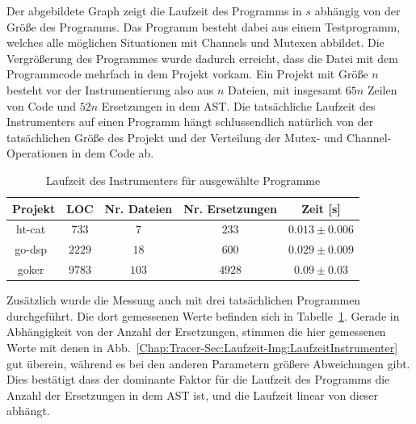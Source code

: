 Der abgebildete Graph zeigt die Laufzeit des Programms in $s$ abhängig von der 
Größe des Programms. Das Programm besteht dabei aus einem Testprogramm, welches 
alle möglichen Situationen mit Channels und Mutexen abbildet. Die Vergrößerung 
des Programmes wurde dadurch erreicht, dass die Datei mit dem Programmcode 
mehrfach in dem Projekt vorkam. Ein Projekt mit Größe $n$ besteht vor der 
Instrumentierung also 
aus $n$ Dateien, mit insgesamt $65n$ Zeilen von Code und $52n$ Ersetzungen
in dem AST. Die tatsächliche Laufzeit des Instrumenters auf einen 
Programm hängt schlussendlich natürlich von der tatsächlichen Größe des 
Projekt und der Verteilung der Mutex- und Channel-Operationen in dem Code ab.\\
\begin{table}[!h]
  \centering
  \begin{tabular}{|c|c|c|c|c|}
  \hline
  Projekt & LOC & Nr. Dateien & Nr. Ersetzungen & Zeit {[}s{]} \\ \hline
  ht-cat~\cite{htcat} & $733$ & $7$ & $233$ & $0.013 \pm 0.006$ \\ \hline
  go-dsp~\cite{go-dsp} & $2229$ & $18$ & $600$ & $0.029 \pm 0.009$ \\ \hline
  goker~\cite{gobench} & $9783$ & $103$ & $4928$ & $0.09 \pm 0.03$ \\ \hline
  \end{tabular}
  \caption{Laufzeit des Instrumenters für ausgewählte Programme}
  \label{Chap:Tracer-Sec:Laufzeit-Tab:LaufzeitInstrumenter}
\end{table}
Zusätzlich wurde die Messung auch mit drei tatsächlichen Programmen 
durchgeführt. Die dort gemessenen Werte befinden sich in 
Tabelle~\ref{Chap:Tracer-Sec:Laufzeit-Tab:LaufzeitInstrumenter}. Gerade in 
Abhängigkeit von der Anzahl der Ersetzungen, stimmen die hier gemessenen Werte
mit denen in Abb.~\ref{Chap:Tracer-Sec:Laufzeit-Img:LaufzeitInstrumenter} gut 
überein, während es bei den anderen Parametern größere Abweichungen gibt.
Dies bestätigt dass der dominante Faktor für die Laufzeit des Programms 
die Anzahl der Ersetzungen in dem AST ist, und die Laufzeit linear von dieser 
abhängt.
